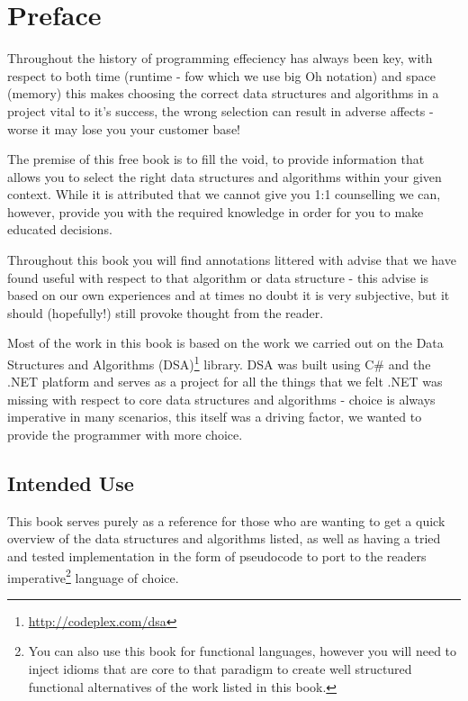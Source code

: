 \chapter*{Preface}
Throughout the history of programming effeciency has always been key, with respect to both time (runtime - fow which we use big Oh notation) and space (memory) this makes choosing the correct data structures and algorithms in a project vital to it's success, the wrong selection can result in adverse affects - worse it may lose you your customer base!

The premise of this free book is to fill the void, to provide information that allows you to select the right data structures and algorithms within your given context. While it is attributed that we cannot give you 1:1 counselling we can, however, provide you with the required knowledge in order for you to make educated decisions.

Throughout this book you will find annotations littered with advise that we have found useful with respect to that algorithm or data structure - this advise is based on our own experiences and at times no doubt it is very subjective, but it should (hopefully!) still provoke thought from the reader.

Most of the work in this book is based on the work we carried out on the Data Structures and Algorithms (DSA)\footnote{\url{http://codeplex.com/dsa}} library. DSA was built using C\# and the .NET platform and serves as a project for all the things that we felt .NET was missing with respect to core data structures and algorithms - choice is always imperative in many scenarios, this itself was a driving factor, we wanted to provide the programmer with more choice.

\section*{Intended Use}
This book serves purely as a reference for those who are wanting to get a quick overview of the data structures and algorithms listed, as well as having a tried and tested implementation in the form of pseudocode to port to the readers imperative\footnote{You can also use this book for functional languages, however you will need to inject idioms that are core to that paradigm to create well structured functional alternatives of the work listed in this book.} language of choice.
